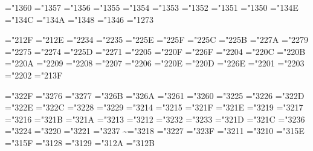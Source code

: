 \mathchardef\coprod="1360
\mathchardef\bigvee="1357
\mathchardef\bigwedge="1356
\mathchardef\biguplus="1355
\mathchardef\bigcap="1354
\mathchardef\bigcup="1353
\mathchardef\intop="1352 \def\int{\intop\nolimits}
\mathchardef\prod="1351
\mathchardef\sum="1350
\mathchardef\bigotimes="134E
\mathchardef\bigoplus="134C
\mathchardef\bigodot="134A
\mathchardef\ointop="1348 \def\oint{\ointop\nolimits}
\mathchardef\bigsqcup="1346
\mathchardef\smallint="1273

\mathchardef\triangleleft="212F
\mathchardef\triangleright="212E
\mathchardef\bigtriangleup="2234
\mathchardef\bigtriangledown="2235
\mathchardef\wedge="225E \let\land=\wedge
\mathchardef\vee="225F \let\lor=\vee
\mathchardef\cap="225C
\mathchardef\cup="225B
\mathchardef\ddagger="227A
\mathchardef\dagger="2279
\mathchardef\sqcap="2275
\mathchardef\sqcup="2274
\mathchardef\uplus="225D
\mathchardef\amalg="2271
\mathchardef\diamond="2205
\mathchardef\bullet="220F
\mathchardef\wr="226F
\mathchardef\div="2204
\mathchardef\odot="220C
\mathchardef\oslash="220B
\mathchardef\otimes="220A
\mathchardef\ominus="2209
\mathchardef\oplus="2208
\mathchardef\mp="2207
\mathchardef\pm="2206
\mathchardef\circ="220E
\mathchardef\bigcirc="220D
\mathchardef\setminus="226E %
\mathchardef\cdot="2201
\mathchardef\ast="2203
\mathchardef\times="2202
\mathchardef\star="213F

\mathchardef\propto="322F
\mathchardef\sqsubseteq="3276
\mathchardef\sqsupseteq="3277
\mathchardef\parallel="326B
\mathchardef\mid="326A
\mathchardef\dashv="3261
\mathchardef\vdash="3260
\mathchardef\nearrow="3225
\mathchardef\searrow="3226
\mathchardef\nwarrow="322D
\mathchardef\swarrow="322E
\mathchardef\Leftrightarrow="322C
\mathchardef\Leftarrow="3228
\mathchardef\Rightarrow="3229
\def\neq{\not=} \let\ne=\neq
\mathchardef\leq="3214 \let\le=\leq
\mathchardef\geq="3215 \let\ge=\geq
\mathchardef\succ="321F
\mathchardef\prec="321E
\mathchardef\approx="3219
\mathchardef\succeq="3217
\mathchardef\preceq="3216
\mathchardef\supset="321B
\mathchardef\subset="321A
\mathchardef\supseteq="3213
\mathchardef\subseteq="3212
\mathchardef\in="3232
\mathchardef\ni="3233 \let\owns=\ni
\mathchardef\gg="321D
\mathchardef\ll="321C
\mathchardef\not="3236
\mathchardef\leftrightarrow="3224
\mathchardef\leftarrow="3220 \let\gets=\leftarrow
\mathchardef\rightarrow="3221 \let\to=\rightarrow
\mathchardef\mapstochar="3237 \def\mapsto{\mapstochar\rightarrow}
\mathchardef\sim="3218
\mathchardef\simeq="3227
\mathchardef\perp="323F
\mathchardef\equiv="3211
\mathchardef\asymp="3210
\mathchardef\smile="315E
\mathchardef\frown="315F
\mathchardef\leftharpoonup="3128
\mathchardef\leftharpoondown="3129
\mathchardef\rightharpoonup="312A
\mathchardef\rightharpoondown="312B

